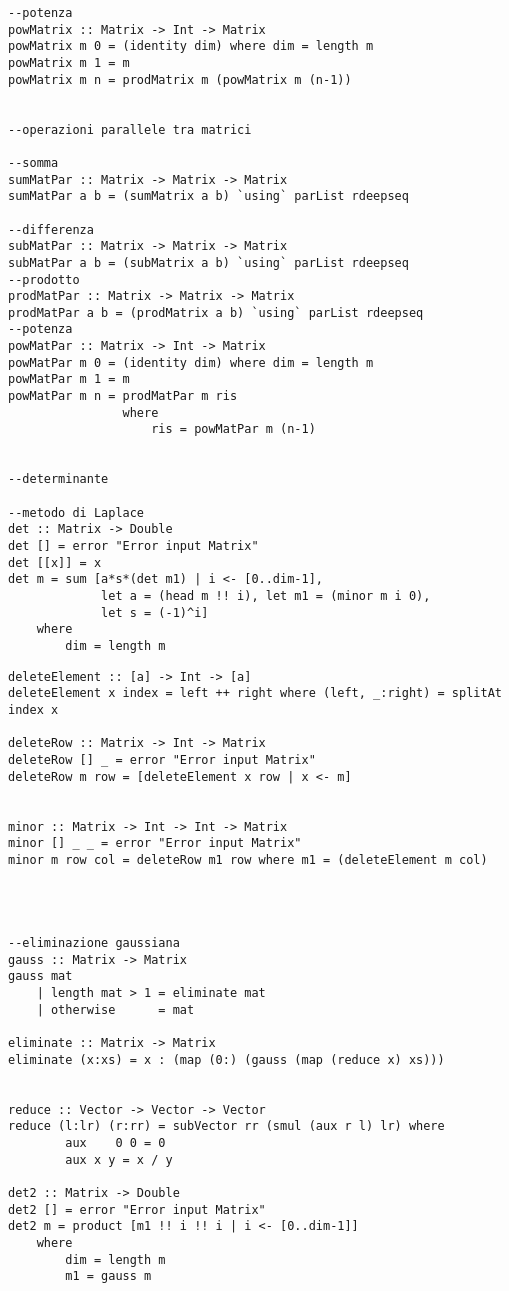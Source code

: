 \begin{verbatim}
--potenza
powMatrix :: Matrix -> Int -> Matrix
powMatrix m 0 = (identity dim) where dim = length m
powMatrix m 1 = m
powMatrix m n = prodMatrix m (powMatrix m (n-1))
    
    
--operazioni parallele tra matrici

--somma    
sumMatPar :: Matrix -> Matrix -> Matrix
sumMatPar a b = (sumMatrix a b) `using` parList rdeepseq

--differenza
subMatPar :: Matrix -> Matrix -> Matrix
subMatPar a b = (subMatrix a b) `using` parList rdeepseq
--prodotto
prodMatPar :: Matrix -> Matrix -> Matrix
prodMatPar a b = (prodMatrix a b) `using` parList rdeepseq
--potenza      
powMatPar :: Matrix -> Int -> Matrix
powMatPar m 0 = (identity dim) where dim = length m
powMatPar m 1 = m
powMatPar m n = prodMatPar m ris
                where
                    ris = powMatPar m (n-1)

                  
--determinante

--metodo di Laplace
det :: Matrix -> Double
det [] = error "Error input Matrix"
det [[x]] = x
det m = sum [a*s*(det m1) | i <- [0..dim-1], 
             let a = (head m !! i), let m1 = (minor m i 0),
             let s = (-1)^i] 
    where
        dim = length m

\end{verbatim}
\newpage
\begin{verbatim}
deleteElement :: [a] -> Int -> [a]
deleteElement x index = left ++ right where (left, _:right) = splitAt index x

deleteRow :: Matrix -> Int -> Matrix
deleteRow [] _ = error "Error input Matrix"
deleteRow m row = [deleteElement x row | x <- m]
                        

minor :: Matrix -> Int -> Int -> Matrix
minor [] _ _ = error "Error input Matrix"
minor m row col = deleteRow m1 row where m1 = (deleteElement m col)




--eliminazione gaussiana        
gauss :: Matrix -> Matrix
gauss mat 
    | length mat > 1 = eliminate mat
    | otherwise      = mat

eliminate :: Matrix -> Matrix
eliminate (x:xs) = x : (map (0:) (gauss (map (reduce x) xs)))    


reduce :: Vector -> Vector -> Vector
reduce (l:lr) (r:rr) = subVector rr (smul (aux r l) lr) where
        aux    0 0 = 0
        aux x y = x / y
        
det2 :: Matrix -> Double
det2 [] = error "Error input Matrix"
det2 m = product [m1 !! i !! i | i <- [0..dim-1]]
    where
        dim = length m
        m1 = gauss m
\end{verbatim}
